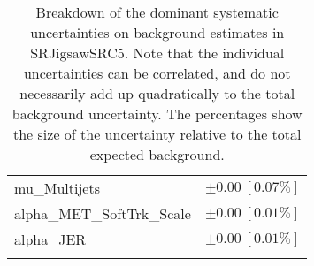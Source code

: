 \begin{table}
\begin{center}
\begin{tabular*}{\textwidth}{@{\extracolsep{\fill}}lc}
mu\_Multijets         & $\pm 0.00\ [0.07\%] $       \\
alpha\_MET\_SoftTrk\_Scale         & $\pm 0.00\ [0.01\%] $       \\
alpha\_JER         & $\pm 0.00\ [0.01\%] $       \\
\noalign{\smallskip}\hline\noalign{\smallskip}
\end{tabular*}
\end{center}
\caption[Breakdown of uncertainty on background estimates]{
Breakdown of the dominant systematic uncertainties on background estimates in SRJigsawSRC5.
Note that the individual uncertainties can be correlated, and do not necessarily add up quadratically to 
the total background uncertainty. The percentages show the size of the uncertainty relative to the total expected background.
\label{table.results.bkgestimate.uncertainties.SRJigsawSRC5}}
\end{table}
%